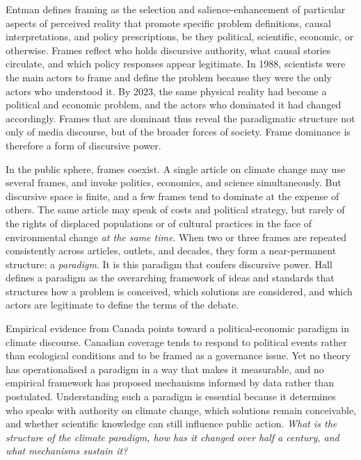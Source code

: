 \documentclass[11pt]{article}
\begin{document}
Entman\cite{entmanFramingClarificationFractured1993} defines framing as the selection and salience-enhancement of particular aspects of perceived reality that promote specific problem definitions, causal interpretations, and policy prescriptions, be they political, scientific, economic, or otherwise. Frames reflect who holds discursive authority, what causal stories circulate, and which policy responses appear legitimate. In 1988, scientists were the main actors to frame and define the problem because they were the only actors who understood it. By 2023, the same physical reality had become a political and economic problem, and the actors who dominated it had changed accordingly. Frames that are dominant thus reveal the paradigmatic structure not only of media discourse, but of the broader forces of society. Frame dominance is therefore a form of discursive power\cite{mccombsAgendaSettingFunctionMass1972, nisbetCommunicatingClimateChange2009}. 

In the public sphere, frames coexist. A single article on climate change may use several frames, and invoke politics, economics, and science simultaneously. But discursive space is finite, and a few frames tend to dominate at the expense of others. The same article may speak of costs and political strategy, but rarely of the rights of displaced populations or of cultural practices in the face of environmental change \emph{at the same time}. When two or three frames are repeated consistently across articles, outlets, and decades, they form a near-permanent structure: a \emph{paradigm}. It is this paradigm that confers discursive power. Hall\cite{hallPolicyParadigmsSocial1993} defines a paradigm as the overarching framework of ideas and standards that structures how a problem is conceived, which solutions are considered, and which actors are legitimate to define the terms of the debate.

Empirical evidence from Canada points toward a political-economic paradigm in climate discourse. Canadian coverage tends to respond to political events rather than ecological conditions\cite{stoddartCanadianNewsMedia2016, schaferWhatDrivesMedia2014, haseClimateChangeNews2021} and to be framed as a governance issue\cite{ahchongAnthropogenicClimateChange2012}. Yet no theory has operationalised a paradigm in a way that makes it measurable, and no empirical framework has proposed mechanisms informed by data rather than postulated. Understanding such a paradigm is essential because it determines who speaks with authority on climate change, which solutions remain conceivable, and whether scientific knowledge can still influence public action\cite{skogstadPolicyParadigmsTransnationalism2011}. \emph{What is the structure of the climate paradigm, how has it changed over half a century, and what mechanisms sustain it?}
\end{document}
